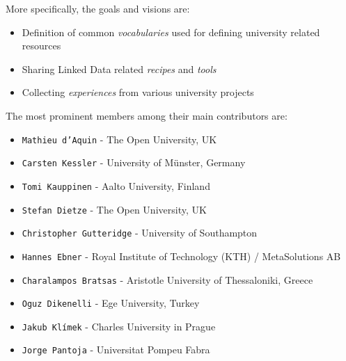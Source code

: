 \documentclass{article}
\begin{document}
More specifically, the goals and visions are:
\begin{itemize}
	\item Definition of common \textit{vocabularies} used for defining university related resources
	\item Sharing Linked Data related \textit{recipes} and \textit{tools}
	\item Collecting \textit{experiences} from various university projects
\end{itemize}

The most prominent members among their main contributors are:
\begin{itemize}
	\item \texttt{Mathieu d'Aquin} - The Open University, UK
	\item \texttt{Carsten Kessler} - University of Münster, Germany
	\item \texttt{Tomi Kauppinen} - Aalto University, Finland
	\item \texttt{Stefan Dietze} - The Open University, UK
	\item \texttt{Christopher Gutteridge} - University of Southampton
	\item \texttt{Hannes Ebner} - Royal Institute of Technology (KTH) / MetaSolutions AB
	\item \texttt{Charalampos Bratsas} - Aristotle University of Thessaloniki, Greece
	\item \texttt{Oguz Dikenelli} - Ege University, Turkey
	\item \texttt{Jakub Klímek} - Charles University in Prague
	\item \texttt{Jorge Pantoja} - Universitat Pompeu Fabra
\end{itemize}
\end{document}
